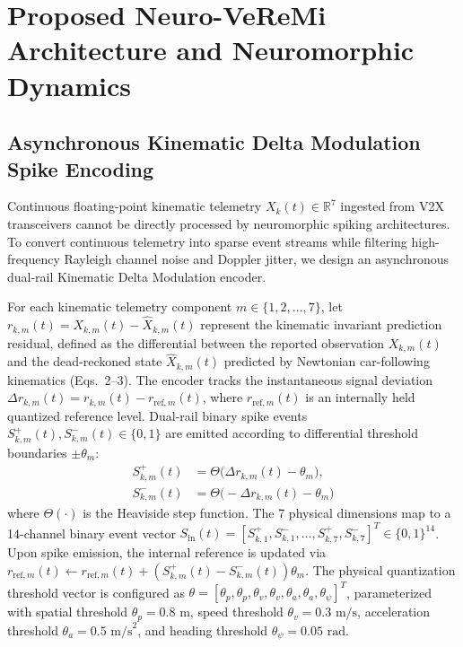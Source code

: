 \documentclass[journal]{IEEEtran}
\begin{document}
\section{Proposed Neuro-VeReMi Architecture and Neuromorphic Dynamics}

\subsection{Asynchronous Kinematic Delta Modulation Spike Encoding}
Continuous floating-point kinematic telemetry $X_k(t) \in \mathbb{R}^7$ ingested from V2X transceivers cannot be directly processed by neuromorphic spiking architectures. To convert continuous telemetry into sparse event streams while filtering high-frequency Rayleigh channel noise and Doppler jitter, we design an asynchronous dual-rail Kinematic Delta Modulation encoder.

For each kinematic telemetry component $m \in \{1, 2, \dots, 7\}$, let $r_{k,m}(t) = X_{k,m}(t) - \hat{X}_{k,m}(t)$ represent the kinematic invariant prediction residual, defined as the differential between the reported observation $X_{k,m}(t)$ and the dead-reckoned state $\hat{X}_{k,m}(t)$ predicted by Newtonian car-following kinematics (Eqs.~2--3). The encoder tracks the instantaneous signal deviation $\Delta r_{k,m}(t) = r_{k,m}(t) - r_{\text{ref}, m}(t)$, where $r_{\text{ref}, m}(t)$ is an internally held quantized reference level. Dual-rail binary spike events $S_{k,m}^+(t), S_{k,m}^-(t) \in \{0, 1\}$ are emitted according to differential threshold boundaries $\pm\theta_m$:
\begin{equation}
\begin{split}
    S_{k,m}^+(t) &= \Theta\big( \Delta r_{k,m}(t) - \theta_m \big), \\
    S_{k,m}^-(t) &= \Theta\big( -\Delta r_{k,m}(t) - \theta_m \big)
\end{split}
\end{equation}
where $\Theta(\cdot)$ is the Heaviside step function. The 7 physical dimensions map to a 14-channel binary event vector $S_{\text{in}}(t) = [S_{k,1}^+, S_{k,1}^-, \dots, S_{k,7}^+, S_{k,7}^-]^T \in \{0, 1\}^{14}$. Upon spike emission, the internal reference is updated via $r_{\text{ref}, m}(t) \leftarrow r_{\text{ref}, m}(t) + (S_{k,m}^+(t) - S_{k,m}^-(t))\theta_m$. The physical quantization threshold vector is configured as $\theta = [\theta_p, \theta_p, \theta_v, \theta_v, \theta_a, \theta_a, \theta_\psi]^T$, parameterized with spatial threshold $\theta_p = 0.8\text{ m}$, speed threshold $\theta_v = 0.3\text{ m/s}$, acceleration threshold $\theta_a = 0.5\text{ m/s}^2$, and heading threshold $\theta_\psi = 0.05\text{ rad}$.
\end{document}
